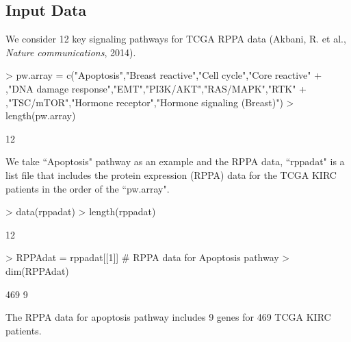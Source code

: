 \documentclass{article}
\begin{document}
\subsection{Input Data}
We consider 12 key signaling pathways for TCGA RPPA data (Akbani, R. et al., {\it Nature communications}, 2014).
\begin{Schunk}
\begin{Sinput}
> pw.array = c("Apoptosis","Breast reactive","Cell cycle","Core reactive"
+              ,"DNA damage response","EMT","PI3K/AKT","RAS/MAPK","RTK"
+              ,"TSC/mTOR","Hormone receptor","Hormone signaling (Breast)")
> length(pw.array)
\end{Sinput}
\begin{Soutput}
[1] 12
\end{Soutput}
\end{Schunk}
We take ``Apoptosis" pathway as an example and the RPPA data, ``rppadat" is a list file that includes the protein expression (RPPA) data for the TCGA KIRC patients in the order of the ``pw.array".
\begin{Schunk}
\begin{Sinput}
> data(rppadat)
> length(rppadat)
\end{Sinput}
\begin{Soutput}
[1] 12
\end{Soutput}
\begin{Sinput}
> RPPAdat = rppadat[[1]] # RPPA data for Apoptosis pathway
> dim(RPPAdat)
\end{Sinput}
\begin{Soutput}
[1] 469   9
\end{Soutput}
\end{Schunk}
The RPPA data for apoptosis pathway includes 9 genes for 469 TCGA KIRC patients.
\end{document}
